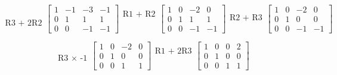 \documentclass[a4paper]{report}
\begin{document}
\begin{equation*}
\begin{matrix}
\\
\\
\text{R3 + 2R2}
\end{matrix}
\begin{bmatrix}
1  & -1 & -3 & -1 \\
0  &  1 & 1  &  1 \\
0  &  0 & -1 & -1
\end{bmatrix}
\begin{matrix}
\text{R1 + R2} \\
\\
\\
\end{matrix}
\begin{bmatrix}
1  &  0 & -2 & 0 \\
0  &  1 & 1  &  1 \\
0  &  0 & -1 & -1
\end{bmatrix}
\begin{matrix}
\\
\text{R2 + R3} \\
\\
\end{matrix}
\begin{bmatrix}
1  &  0 & -2 & 0 \\
0  &  1 & 0  & 0 \\
0  &  0 & -1 & -1
\end{bmatrix}
\end{equation*}

\begin{equation*}
\begin{matrix}
\\
\\
\text{R3 $\times$ -1} \\
\end{matrix}
\begin{bmatrix}
1  &  0 & -2 & 0 \\
0  &  1 & 0  & 0 \\
0  &  0 & 1  & 1
\end{bmatrix}
\begin{matrix}
\text{R1 + 2R3} \\
\\
\\
\end{matrix}
\begin{bmatrix}
1  &  0 & 0  & 2 \\
0  &  1 & 0  & 0 \\
0  &  0 & 1  & 1
\end{bmatrix}
\end{equation*}
\end{document}
